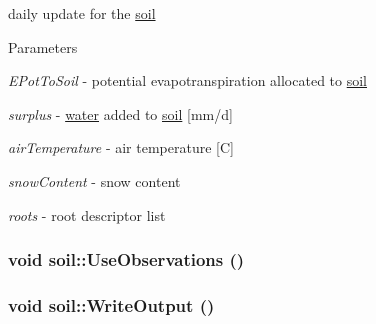 daily update for the \hyperlink{classsoil}{soil} 
\begin{DoxyParams}{Parameters}
\item[{\em EPotToSoil}]-\/ potential evapotranspiration allocated to \hyperlink{classsoil}{soil} \item[{\em surplus}]-\/ \hyperlink{classwater}{water} added to \hyperlink{classsoil}{soil} \mbox{[}mm/d\mbox{]} \item[{\em airTemperature}]-\/ air temperature \mbox{[}C\mbox{]} \item[{\em snowContent}]-\/ snow content \item[{\em roots}]-\/ root descriptor list \end{DoxyParams}
\hypertarget{classsoil_a817adae4b17bca5a4f4d075295b5d09f}{
\subsubsection[{UseObservations}]{\setlength{\rightskip}{0pt plus 5cm}void soil::UseObservations ()}}
\label{classsoil_a817adae4b17bca5a4f4d075295b5d09f}
\hypertarget{classsoil_a2dfefa36aa46caa719e36780e87bee59}{
\subsubsection[{WriteOutput}]{\setlength{\rightskip}{0pt plus 5cm}void soil::WriteOutput ()}}
\label{classsoil_a2dfefa36aa46caa719e36780e87bee59}


